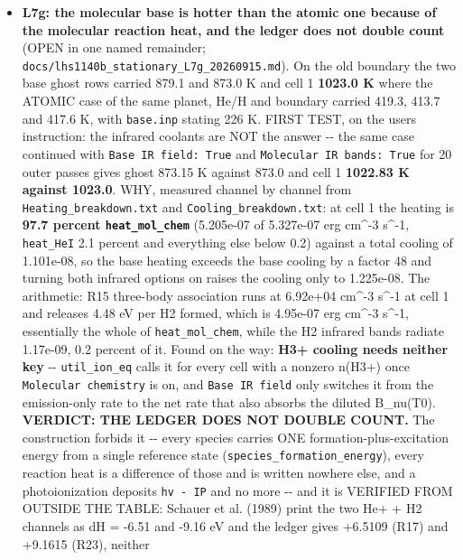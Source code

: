 \documentclass[english,a4paper]{my_memo}
\begin{document}
\begin{itemize}
  section 6 is no longer the open question it was; the root correction, the
  reaction record and the three rate repairs are independent of the boundary
  and stand.
\item
  \textbf{L7g: the molecular base is hotter than the atomic one because of the
  molecular reaction heat, and the ledger does not double count} (OPEN in one
  named remainder; \texttt{docs/lhs1140b\_stationary\_L7g\_20260915.md}). On the old
  boundary the two base ghost rows carried 879.1 and 873.0 K and cell 1
  \textbf{1023.0 K} where the ATOMIC case of the same planet, He/H and boundary
  carried 419.3, 413.7 and 417.6 K, with \texttt{base.inp} stating 226 K. FIRST TEST,
  on the user\textquotesingle s instruction: the infrared coolants are NOT the answer -\/- the
  same case continued with \texttt{Base\ IR\ field:\ True} and \texttt{Molecular\ IR\ bands:\ True}
  for 20 outer passes gives ghost 873.15 K against 873.0 and cell 1 \textbf{1022.83 K
  against 1023.0}. WHY, measured channel by channel from
  \texttt{Heating\_breakdown.txt} and \texttt{Cooling\_breakdown.txt}: at cell 1 the heating is
  \textbf{97.7 percent \texttt{heat\_mol\_chem}} (5.205e-07 of 5.327e-07 erg cm\^{}-3 s\^{}-1,
  \texttt{heat\_HeI} 2.1 percent and everything else below 0.2) against a total cooling
  of 1.101e-08, so the base heating exceeds the base cooling by a factor 48 and
  turning both infrared options on raises the cooling only to 1.225e-08. The
  arithmetic: R15 three-body association runs at 6.92e+04 cm\^{}-3 s\^{}-1 at cell 1
  and releases 4.48 eV per H2 formed, which is 4.95e-07 erg cm\^{}-3 s\^{}-1,
  essentially the whole of \texttt{heat\_mol\_chem}, while the H2 infrared bands radiate
  1.17e-09, 0.2 percent of it. Found on the way: \textbf{H3+ cooling needs neither
  key} -\/- \texttt{util\_ion\_eq} calls it for every cell with a nonzero n(H3+) once
  \texttt{Molecular\ chemistry} is on, and \texttt{Base\ IR\ field} only switches it from the
  emission-only rate to the net rate that also absorbs the diluted B\_nu(T0).
  \textbf{VERDICT: THE LEDGER DOES NOT DOUBLE COUNT.} The construction forbids it -\/-
  every species carries ONE formation-plus-excitation energy from a single
  reference state (\texttt{species\_formation\_energy}), every reaction heat is a
  difference of those and is written nowhere else, and a photoionization
  deposits \texttt{hv\ -\ IP} and no more -\/- and it is VERIFIED FROM OUTSIDE THE TABLE:
  Schauer et al. (1989) print the two He+ + H2 channels as dH = -6.51 and
  -9.16 eV and the ledger gives +6.5109 (R17) and +9.1615 (R23), neither

\end{itemize}
\end{document}
